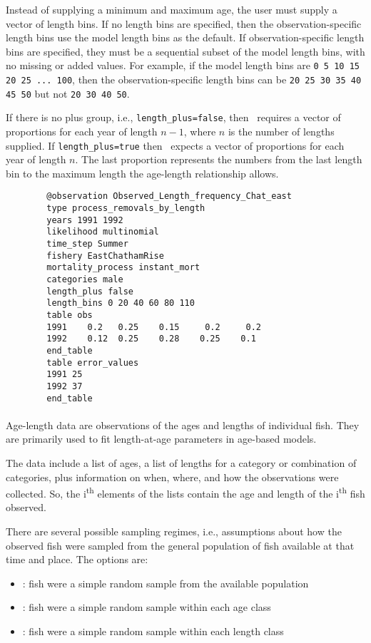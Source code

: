 Instead of supplying a minimum and maximum age, the user must supply a vector of length bins. If no length bins are specified, then the observation-specific length bins use the model length bins as the default. If observation-specific length bins are specified, they must be a sequential subset of the model length bins, with no missing or added values. For example, if the model length bins are \texttt{0 5 10 15 20 25 ... 100}, then the observation-specific length bins can be \texttt{20 25 30 35 40 45 50} but not \texttt{20 30 40 50}.

If there is no plus group, i.e., \texttt{length\_plus=false}, then \CNAME\ requires a vector of proportions for each year of length $n - 1$, where $n$ is the number of lengths supplied. If \texttt{length\_plus=true} then \CNAME\ expects a vector of proportions for each year of length $n$. The last proportion represents the numbers from the last length bin to the maximum length the age-length relationship allows.

{\small{\begin{verbatim}
		@observation Observed_Length_frequency_Chat_east
		type process_removals_by_length
		years 1991 1992
		likelihood multinomial
		time_step Summer
		fishery EastChathamRise
		mortality_process instant_mort
		categories male
		length_plus false
		length_bins 0 20 40 60 80 110
		table obs
		1991    0.2   0.25    0.15     0.2     0.2
		1992    0.12  0.25    0.28    0.25    0.1
		end_table
		table error_values
		1991 25
		1992 37
		end_table
		\end{verbatim}}}

\paragraph*{}\label{sec:Observation-AgeSize}
Age-length data are observations of the ages and lengths of individual fish. They are primarily used to fit length-at-age parameters in age-based models. 

The data include a list of ages, a list of lengths for a category or combination of categories, plus information on when, where, and how the observations were collected. So, the i\textsuperscript{th} elements of the lists contain the age and length of the i\textsuperscript{th} fish observed.

There are several possible sampling regimes, i.e., assumptions about how the observed fish were sampled from the general population of fish available at that time and place. The options are: 
\begin{itemize}
	\item {}: fish were a simple random sample from the available population
	\item {}: fish were a simple random sample within each age class 
	\item {}: fish were a simple random sample within each length class
\end{itemize}

